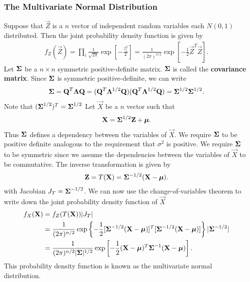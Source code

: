 \documentclass{memoir}
\begin{document}
\subsubsection{The Multivariate Normal Distribution}
Suppose that $\vec{Z}$ is a $n$ vector of independent random variables each $N(0,1)$ distributed. Then the joint probability density function is given by
\begin{align*}
    f_Z(\vec{Z}) = \prod_i \frac{1}{\sqrt{2 \pi}} \exp\left[-\frac{z_i^2}{2}\right] = \frac{1}{(2 \pi)^{n/2}} \exp\left[-\frac{1}{2}\vec{Z}^T \vec{Z}\right].
\end{align*}
Let $\boldsymbol{\mathbf{\Sigma}}$ be a $n \times n$ symmetric positive-definite matrix. $\boldsymbol{\mathbf{\Sigma}}$ is called the \textbf{covariance matrix}. Since $\boldsymbol{\mathbf{\Sigma}}$ is symmetric positive-definite, we can write
\begin{align*}
    \boldsymbol{\mathbf{\Sigma}} = \boldsymbol{\mathbf{Q}}^T \boldsymbol{\mathbf{\Lambda}} \boldsymbol{\mathbf{Q}} = (\boldsymbol{\mathbf{Q}}^T \boldsymbol{\mathbf{\Lambda}}^{1/2} \boldsymbol{\mathbf{Q}}) (\boldsymbol{\mathbf{Q}}^T \boldsymbol{\mathbf{\Lambda}}^{1/2} \boldsymbol{\mathbf{Q}}) = \boldsymbol{\mathbf{\Sigma}}^{1/2} \boldsymbol{\mathbf{\Sigma}}^{1/2}.
\end{align*}
Note that $(\boldsymbol{\mathbf{\Sigma}}^{1/2})^T = \boldsymbol{\mathbf{\Sigma}}^{1/2}$
Let $\vec{X}$ be a $n$ vector such that
\begin{align*}
    \boldsymbol{\mathbf{X}} = \boldsymbol{\mathbf{\Sigma}}^{1/2} \boldsymbol{\mathbf{Z}} + \boldsymbol{\mathbf{\mu}}.
\end{align*}
Thus $\boldsymbol{\mathbf{\Sigma}}$ defines a dependency between the variables of $\vec{X}$. We require $\boldsymbol{\mathbf{\Sigma}}$ to be positive definite analogous to the requirement that $\sigma^2$ is positive. We require $\boldsymbol{\mathbf{\Sigma}}$ to be symmetric since we assume the dependencies between the variables of $\vec{X}$ to be commutative. The inverse transformation is given by
\begin{align*}
    \boldsymbol{\mathbf{Z}} = T(\boldsymbol{\mathbf{X}}) = \boldsymbol{\mathbf{\Sigma}}^{-1/2}(\boldsymbol{\mathbf{X}}-\boldsymbol{\mathbf{\mu}}).
\end{align*}
with Jacobian $J_T = \boldsymbol{\mathbf{\Sigma}}^{-1/2}$. We can now use the change-of-variables theorem to write down the joint probability density function of $\vec{X}$
\begin{align*}
    f_X(\boldsymbol{\mathbf{X}}) &= f_Z(T(\boldsymbol{\mathbf{X}})) |J_T| \\
    &= \frac{1}{(2 \pi)^{n/2}} \exp\left\{-\frac{1}{2}[\boldsymbol{\mathbf{\Sigma}}^{-1/2}(\boldsymbol{\mathbf{X}}-\boldsymbol{\mathbf{\mu}})]^T [\boldsymbol{\mathbf{\Sigma}}^{-1/2}(\boldsymbol{\mathbf{X}}-\boldsymbol{\mathbf{\mu}})]\right\} |\boldsymbol{\mathbf{\Sigma}}^{-1/2}| \\
    &= \frac{1}{(2 \pi)^{n/2} |\boldsymbol{\mathbf{\Sigma}}|^{1/2}} \exp\left[-\frac{1}{2}(\boldsymbol{\mathbf{X}}-\boldsymbol{\mathbf{\mu}})^T \boldsymbol{\mathbf{\Sigma}}^{-1} (\boldsymbol{\mathbf{X}}-\boldsymbol{\mathbf{\mu}})\right].
\end{align*}
This probability density function is known as the multivariate normal distribution.
\end{document}

